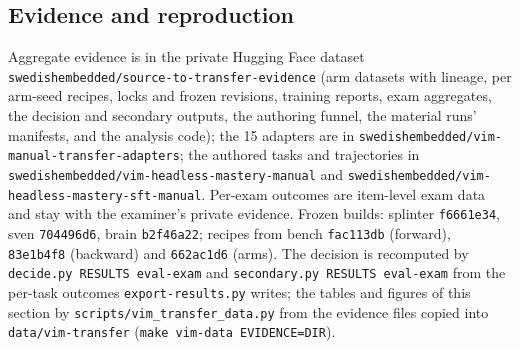 \subsection{Evidence and reproduction}\label{sec:vim-evidence}
\begin{sloppypar}

Aggregate evidence is in the private Hugging Face dataset \nolinkurl{swedishembedded/source-to-transfer-evidence} (arm datasets
with lineage, per arm-seed recipes, locks and frozen revisions, training reports, exam aggregates, the decision and secondary
outputs, the authoring funnel, the material runs' manifests, and the analysis code); the 15 adapters are in
\nolinkurl{swedishembedded/vim-manual-transfer-adapters}; the authored tasks and trajectories in
\nolinkurl{swedishembedded/vim-headless-mastery-manual} and \nolinkurl{swedishembedded/vim-headless-mastery-sft-manual}. Per-exam
outcomes are item-level exam data and stay with the examiner's private evidence. Frozen builds: splinter \texttt{f6661e34},
sven \texttt{704496d6}, brain \texttt{b2f46a22}; recipes from bench \texttt{fac113db} (forward), \texttt{83e1b4f8}
(backward) and \texttt{662ac1d6} (arms). The decision is recomputed by \texttt{decide.py RESULTS eval-exam} and
\texttt{secondary.py RESULTS eval-exam} from the per-task outcomes \texttt{export-results.py} writes; the tables and figures
of this section by \texttt{scripts/vim\_transfer\_data.py} from the evidence files copied into \texttt{data/vim-transfer}
(\texttt{make vim-data EVIDENCE=DIR}).
\end{sloppypar}
